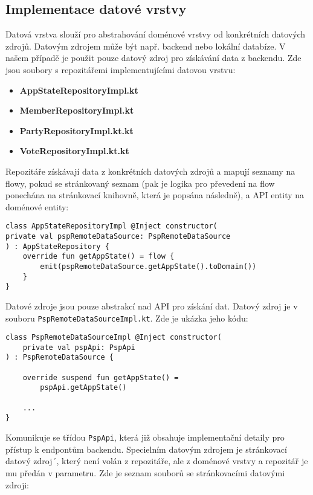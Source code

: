 \subsection {Implementace datové vrstvy}
Datová vrstva slouží pro abstrahování doménové vrstvy od konkrétních datových zdrojů. Datovým zdrojem může být např. backend nebo lokální databíze. V našem případě je použit pouze datový zdroj pro získávání data z backendu. Zde jsou soubory s repozitářemi implementujícími datovou vrstvu:

\begin{itemize}
	\item \textbf{AppStateRepositoryImpl.kt}
	\item \textbf{MemberRepositoryImpl.kt}
	\item \textbf{PartyRepositoryImpl.kt.kt}
	\item \textbf{VoteRepositoryImpl.kt.kt}
\end{itemize}

\noindent Repozitáře získávají data z konkrétních datových zdrojů a mapují seznamy na flowy, pokud se stránkovaný seznam (pak je logika pro převedení na flow ponechána na stránkovací knihovně, která je popsána následně), a API entity na doménové entity:

\begin{lstlisting}[caption={Ukázka datové vrstvy pro data o stavu aplikace}, label={lst:use-case-repository}, tabsize=2]
class AppStateRepositoryImpl @Inject constructor(
private val pspRemoteDataSource: PspRemoteDataSource
) : AppStateRepository {
	override fun getAppState() = flow { 			
		emit(pspRemoteDataSource.getAppState().toDomain()) 
	}
}
\end{lstlisting}

\noindent Datové zdroje jsou pouze abstrakcí nad API pro získání dat. Datový zdroj je v souboru \linebreak \lstinline|PspRemoteDataSourceImpl.kt|. Zde je ukázka jeho kódu:

\begin{lstlisting}[caption={Ukázka datového zdroje}, label={lst:data-source}, tabsize=2]
class PspRemoteDataSourceImpl @Inject constructor(
	private val pspApi: PspApi
) : PspRemoteDataSource {
	
	override suspend fun getAppState() = 
		pspApi.getAppState()
		
	...
}
\end{lstlisting}

\noindent Komunikuje se třídou \lstinline|PspApi|, která již obsahuje implementační detaily pro přístup k endpontům backendu. Specielním datovým zdrojem je stránkovací datový zdroj´, který není volán z repozitáře, ale z doménové vrstvy a repozitář je mu předán v parametru. Zde je seznam souborů se stránkovacími datovými zdroji:


